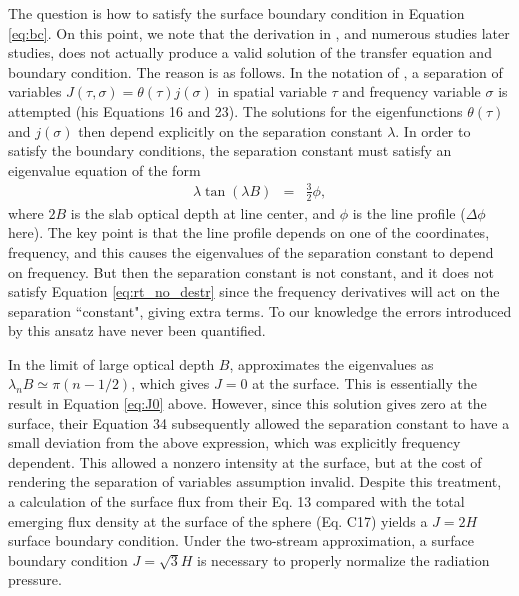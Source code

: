 \documentclass{aastex63}
\newcommand{\be}{\begin{eqnarray}}
\newcommand{\ee}{\end{eqnarray}}
\begin{document}
The question is how to satisfy the surface boundary condition in Equation \ref{eq:bc}. On this point, we note that the derivation in \citet{1973MNRAS.162...43H}, and numerous studies later studies, does not actually produce a valid solution of the transfer equation and boundary condition. The reason is as follows. In the notation of \citet{1973MNRAS.162...43H}, a separation of variables
$J(\tau,\sigma) = \theta(\tau) j(\sigma)$ in spatial variable $\tau$ and frequency variable $\sigma$ is attempted (his Equations 16 and 23). The solutions for the eigenfunctions $\theta(\tau)$ and $j(\sigma)$ then depend explicitly on the separation constant $\lambda$. In order to satisfy the boundary conditions, the separation constant must satisfy an eigenvalue equation of the form
\be
\lambda \tan(\lambda B) & = & \frac{3}{2} \phi,
\label{eq:evalue}
\ee
where $2B$ is the slab optical depth at line center, and $\phi$ is the line profile ($\Delta \phi$ here). The key point is that the line profile depends on one of the coordinates, frequency, and this causes the eigenvalues of the separation constant to depend on frequency. But then the separation constant is not constant, and it does not satisfy Equation \ref{eq:rt_no_destr} since the frequency derivatives will act on the separation ``constant", giving extra terms. To our knowledge the errors introduced by this ansatz have never been quantified. 

In the limit of large optical depth $B$, \citealt{1973MNRAS.162...43H} approximates the eigenvalues as $\lambda_n B \simeq \pi (n-1/2)$, which gives $J=0$ at the surface. This is essentially the result in Equation \ref{eq:J0} above. However, since this solution gives zero at the surface, their Equation 34 subsequently allowed the separation constant to have a small deviation from the above expression, which was explicitly frequency dependent. This allowed a nonzero intensity at the surface, but at the cost of rendering the separation of variables assumption invalid. Despite this treatment, a calculation of the surface flux from their Eq. 13 compared with the total emerging flux density at the surface of the sphere (Eq. C17) yields a $J=2H$ surface boundary condition. Under the two-stream approximation, a surface boundary condition $J=\sqrt{3}H$ is necessary to properly normalize the radiation pressure.
\end{document}
